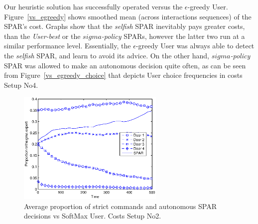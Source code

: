 \documentclass{msdm2012}
\begin{document}
Our heuristic solution has successfully operated versus the
$\epsilon$-greedy User. Figure~\ref{vs_egreedy} shows smoothed mean
(across interactions sequences) of the SPAR's cost. Graphs show that
the {\em selfish} SPAR inevitably pays greater costs, than the {\em
  User-best} or the {\em $sigma$-policy} SPARs, however the latter two
run at a similar performance level. Essentially, the $\epsilon$-greedy
User was always able to detect the {\em selfish} SPAR, and learn to
avoid its advice. On the other hand, {\em $sigma$-policy} SPAR was
allowed to make an autonomous decision quite often, as can be seen from
Figure~\ref{vs_egreedy_choice} that depicts User choice frequencies
in costs Setup No4.


\begin{figure}[hbt]
\centerline{\includegraphics[width=7cm]{img/prob_softmax_sigma_v2.eps}}
\caption{\label{vs_softmax_choice}Average proportion of strict commands and autonomous SPAR decisions vs SoftMax User. Costs Setup No2.}
\end{figure}
\end{document}
